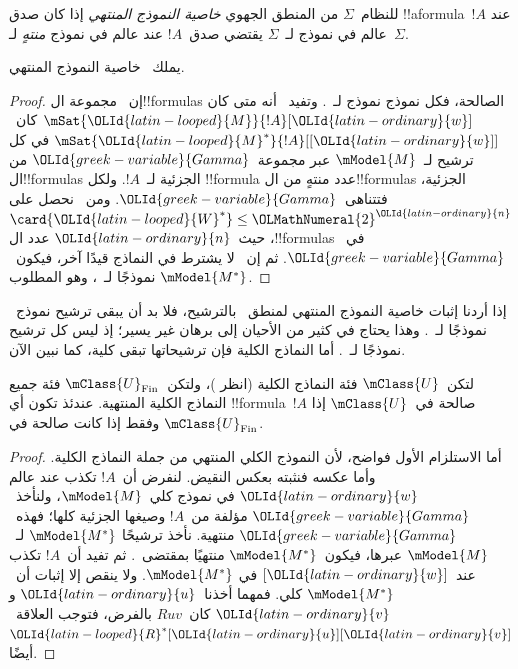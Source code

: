 \documentclass[../../../include/open-logic-section]{subfiles}
\begin{document}


\begin{defn}
  للنظام~$\Sigma$ من المنطق الجهوي \emph{خاصية النموذج المنتهي} إذا
  كان صدق !!a{formula}~$!A$ عند عالم في نموذج لـ~$\Sigma$ يقتضي
  صدق~$!A$ عند عالم في نموذج \emph{منتهٍ} لـ~$\Sigma$.
\end{defn}

\begin{prop}
  يملك~ خاصية النموذج المنتهي.
\end{prop}

\begin{proof}
  إن~ مجموعة ال!!{formula}s الصالحة، فكل نموذج نموذج
  لـ~. وتفيد~ أنه متى كان
  $\mSat{{\OLId{latin-looped}{M}}}{!A}[{\OLId{latin-ordinary}{w}}]$ كان~$\mSat{{\OLId{latin-looped}{M}}^*}{!A}[{[{\OLId{latin-ordinary}{w}}]}]$ في كل ترشيح
  لـ~$\mModel{M}$ عبر مجموعة~${\OLId{greek-variable}{Gamma}}$ من ال!!{formula}s الجزئية
  لـ~$!A$. ولكل !!{formula} عدد منتهٍ من ال!!{formula}s الجزئية،
  فتتناهى~${\OLId{greek-variable}{Gamma}}$. ومن~ نحصل على
  $\card{{\OLId{latin-looped}{W}}^*} \le {\OLMathNumeral{2}}^{\OLId{latin-ordinary}{n}}$، حيث~${\OLId{latin-ordinary}{n}}$ عدد ال!!{formula}s في~${\OLId{greek-variable}{Gamma}}$.
  ثم إن~ لا يشترط في النماذج قيدًا آخر، فيكون~$\mModel{M^*}$
  نموذجًا لـ~، وهو المطلوب.
\end{proof}

إذا أردنا إثبات خاصية النموذج المنتهي لمنطق~ بالترشيح، فلا بد
أن يبقى ترشيح نموذج~ نموذجًا لـ~. وهذا يحتاج في كثير من
الأحيان إلى برهان غير يسير؛ إذ ليس كل ترشيح نموذجًا لـ~.
أما النماذج الكلية فإن ترشيحاتها تبقى كلية، كما نبين الآن.

\begin{prop}
  لتكن~$\mClass{U}$ فئة النماذج الكلية (انظر
  )، ولتكن~$\mClass{U}_\mathrm{Fin}$
  فئة جميع النماذج الكلية المنتهية. عندئذ تكون أي !!{formula}~$!A$
  صالحة في~$\mClass{U}$ إذا وفقط إذا كانت صالحة في
  $\mClass{U}_\mathrm{Fin}$.
\end{prop}

\begin{proof}
  أما الاستلزام الأول فواضح، لأن النموذج الكلي المنتهي من جملة النماذج
  الكلية. وأما عكسه فنثبته بعكس النقيض. لنفرض أن~$!A$ تكذب عند عالم
  ${\OLId{latin-ordinary}{w}}$ في نموذج كلي~$\mModel{M}$، ولنأخذ~${\OLId{greek-variable}{Gamma}}$ مؤلفة من~$!A$
  وصيغها الجزئية كلها؛ فهذه~${\OLId{greek-variable}{Gamma}}$ منتهية. نأخذ ترشيحًا
  $\mModel{M^*}$ لـ~$\mModel{M}$ عبرها، فيكون~$\mModel{M^*}$ منتهيًا
  بمقتضى~. ثم تفيد
   أن~$!A$ تكذب عند~$[{\OLId{latin-ordinary}{w}}]$ في
  $\mModel{M^*}$. ولا ينقص إلا إثبات أن~$\mModel{M^*}$ كلي.
  فمهما أخذنا~${\OLId{latin-ordinary}{u}}$ و${\OLId{latin-ordinary}{v}}$ كان~$Ruv$ بالفرض، فتوجب
  العلاقة~${\OLId{latin-looped}{R}}^*[{\OLId{latin-ordinary}{u}}][{\OLId{latin-ordinary}{v}}]$ أيضًا.
\end{proof}
\end{document}

